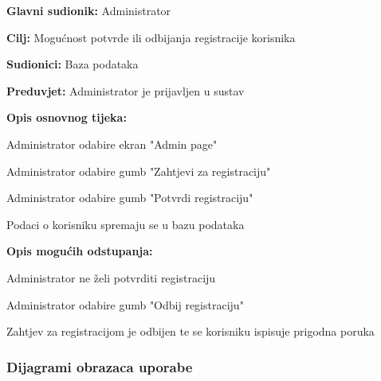 					\begin{packed_item}
						
						\item \textbf{Glavni sudionik: }Administrator
						\item  \textbf{Cilj:} Mogućnost potvrde ili odbijanja registracije korisnika
						\item  \textbf{Sudionici:} Baza podataka
						\item  \textbf{Preduvjet:} Administrator je prijavljen u sustav
						\item  \textbf{Opis osnovnog tijeka:}
						
						\item[] \begin{packed_enum}
							
							\item Administrator odabire ekran "Admin page"
							\item Administrator odabire gumb "Zahtjevi za registraciju"
							\item Administrator odabire gumb "Potvrdi registraciju"
							\item Podaci o korisniku spremaju se u bazu podataka
						\end{packed_enum}
						
						\item  \textbf{Opis mogućih odstupanja:}
						
						\item[] \begin{packed_item}
							
							\item[3.a] Administrator ne želi potvrditi registraciju
							\item[] \begin{packed_enum}
								
								\item Administrator odabire gumb "Odbij registraciju"
								\item Zahtjev za registracijom je odbijen te se korisniku ispisuje prigodna poruka
								
							\end{packed_enum}
							
						\end{packed_item}
					\end{packed_item}
				
				\subsubsection{Dijagrami obrazaca uporabe}
					
